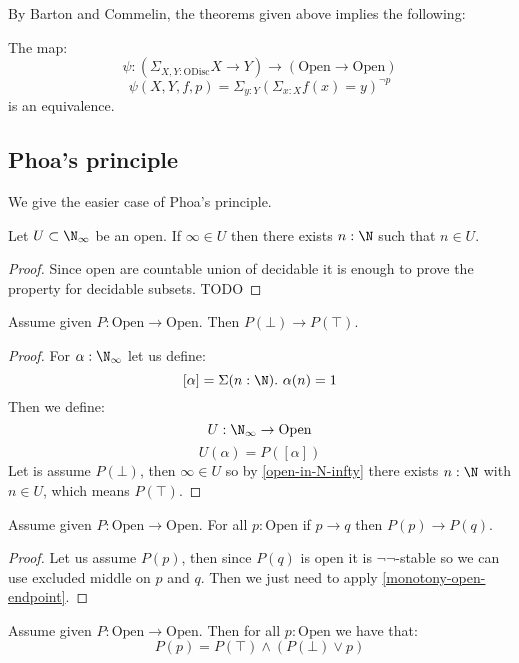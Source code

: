 By Barton and Commelin, the theorems given above implies the following:

\begin{theorem}
The map:
\[\psi: \left(\Sigma_{X,Y:\mathrm{ODisc}} X\to Y\right)  \to (\mathrm{Open}\to\mathrm{Open})\]
\[\psi(X,Y,f,p) = \Sigma_{y:Y} (\Sigma_{x:X} f(x)=y)^{\neg p}\]
is an equivalence.
\end{theorem}

\subsection{Phoa's principle}

We give the easier case of Phoa's principle.

\begin{lemma}\label{open-in-N-infty}
Let $U\subset \N_\infty$ be an open. If $\infty\in U$ then there exists $n:\N$ such that $n\in U$.
\end{lemma}

\begin{proof}
Since open are countable union of decidable it is enough to prove the property for decidable subsets. TODO
\end{proof}

\begin{lemma}\label{monotony-open-endpoint}
Assume given $P:\mathrm{Open}\to\mathrm{Open}$. Then $P(\bot)\to P(\top)$.
\end{lemma}

\begin{proof}
For $\alpha:\N_\infty$ let us define:
\[[\alpha] = \Sigma(n:\N).\ \alpha(n)=1\]
Then we define:
\[U:\N_\infty\to\mathrm{Open}\]
\[U(\alpha) = P([\alpha])\]
Let is assume $P(\bot)$, then $\infty\in U$ so by \cref{open-in-N-infty} there exists $n:\N$ with $n\in U$, which means $P(\top)$.
\end{proof}

\begin{lemma}\label{monotony-open}
Assume given $P:\mathrm{Open}\to\mathrm{Open}$. For all $p:\mathrm{Open}$ if $p\to q$ then $P(p)\to P(q)$.
\end{lemma}

\begin{proof}
Let us assume $P(p)$, then since $P(q)$ is open it is $\neg\neg$-stable so we can use excluded middle on $p$ and $q$. Then we just need to apply \cref{monotony-open-endpoint}.
\end{proof}

\begin{lemma}
Assume given $P:\mathrm{Open}\to\mathrm{Open}$. Then for all $p:\mathrm{Open}$ we have that:
\[P(p) = P(\top)\land(P(\bot)\lor p)\]
\end{lemma}

